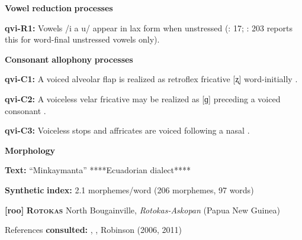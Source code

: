 \documentclass[output=paper]{langsci/langscibook}
\begin{document}
\begin{styleBody}
\textbf{Vowel} \textbf{reduction} \textbf{processes}
\end{styleBody}

\begin{styleBody}
\textbf{qvi-R1:} Vowels /i a u/ appear in lax form when unstressed (\citealt{Jake1983}: 17; \citealt{Cole1982}: 203 reports this for word-final unstressed vowels only).
\end{styleBody}

\begin{styleBody}
\textbf{Consonant} \textbf{allophony} \textbf{processes}
\end{styleBody}

\begin{styleBody}
\textbf{qvi-C1:} A voiced alveolar flap is realized as retroflex fricative [ʐ] word-initially \citep[202]{Cole1982}.
\end{styleBody}

\begin{styleBody}
\textbf{qvi-C2:} A voiceless velar fricative may be realized as [ɡ] preceding a voiced consonant \citep[201]{Cole1982}.
\end{styleBody}

\begin{styleBody}
\textbf{qvi-C3:} Voiceless stops and affricates are voiced following a nasal \citep[200]{Cole1982}.
\end{styleBody}

\begin{styleBody}
\textbf{Morphology}
\end{styleBody}

\begin{styleBody}
\textbf{Text:} “Minkaymanta” \citep[442-55]{Carpenter1982} ****Ecuadorian dialect****
\end{styleBody}

\begin{styleBody}
\textbf{Synthetic} \textbf{index:} 2.1 morphemes/word (206 morphemes, 97 words)
\end{styleBody}

\begin{styleBody}
\textbf{[roo]}   \textbf{\textsc{Rotokas}}  North Bougainville, \textit{Rotokas-Askopan} (Papua New Guinea)
\end{styleBody}

\begin{styleBody}
References \textbf{consulted:} \citet{FirchowFirchow1969}, \citet{FirchowEtAl1973}, Robinson (2006, 2011) 
\end{styleBody}
\end{document}
